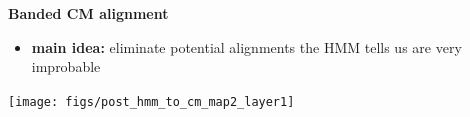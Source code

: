 \documentclass[landscape]{slides}
\begin{document}
\begin{slide}
\begin{center}
\large
\textbf{Banded CM alignment}
\end{center}
\medskip
\small
\begin{itemize}
\item
\textbf{main idea:} eliminate potential alignments the HMM tells us are very improbable
\end{itemize}
\begin{center}
\texttt{[image: figs/post\_hmm\_to\_cm\_map2\_layer1]}
\end{center}
\vfill
\end{slide}
\end{document}
